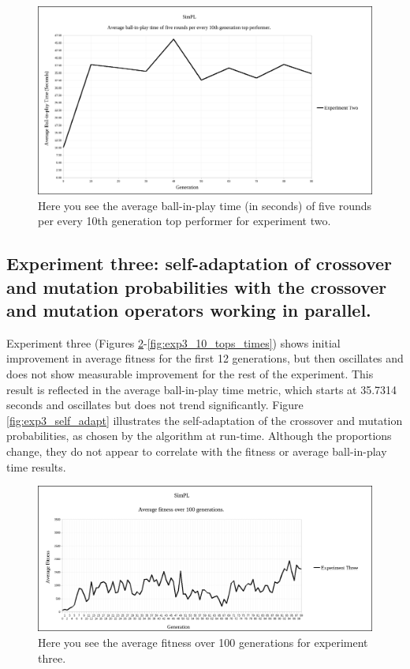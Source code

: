 \documentclass[a4paper,10pt]{article}
\begin{document}
\begin{figure}[H]  
  \centering
  \includegraphics[width=1\textwidth]{figures/exp2_10_tops_times.png}
  \caption{Here you see the average ball-in-play time (in seconds) of five rounds per every 10th generation top performer for experiment two.}
  \label{fig:exp2_10_tops_times}
\end{figure}

\subsection{Experiment three: self-adaptation of crossover and mutation probabilities with the crossover and mutation operators working in parallel.}

Experiment three (Figures \ref{fig:exp3_avg_fit}-\ref{fig:exp3_10_tops_times}) shows initial improvement in average fitness for the first 12 generations, but then oscillates and does not show measurable improvement for the rest of the experiment. This result is reflected in the average ball-in-play time metric, which starts at 35.7314 seconds and oscillates but does not trend significantly. Figure \ref{fig:exp3_self_adapt} illustrates the self-adaptation of the crossover and mutation probabilities, as chosen by the algorithm at run-time. Although the proportions change, they do not appear to correlate with the fitness or average ball-in-play time results.

\begin{figure}[H]  
  \centering
  \includegraphics[width=1\textwidth]{figures/exp3_avg_fit.png}
  \caption{Here you see the average fitness over 100 generations for experiment three.}
  \label{fig:exp3_avg_fit}
\end{figure}
\end{document}
